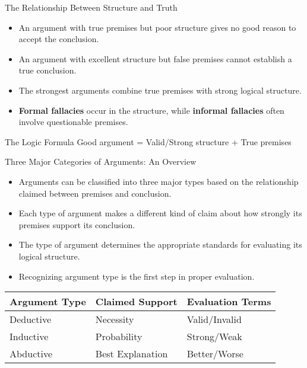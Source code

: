 \documentclass{beamer}
\begin{document}
\begin{frame}{The Relationship Between Structure and Truth}
    \begin{itemize}
        \item An argument with true premises but poor structure gives no good reason to accept the conclusion.
        \item An argument with excellent structure but false premises cannot establish a true conclusion.
        \item The strongest arguments combine true premises with strong logical structure.
        \item \textbf{Formal fallacies} occur in the structure, while \textbf{informal fallacies} often involve questionable premises.
    \end{itemize}
    
    \begin{block}{The Logic Formula}
        Good argument = Valid/Strong structure + True premises
    \end{block}
\end{frame}

\begin{frame}{Three Major Categories of Arguments: An Overview}
    \begin{itemize}
        \item Arguments can be classified into three major types based on the relationship claimed between premises and conclusion.
        \item Each type of argument makes a different kind of claim about how strongly its premises support its conclusion.
        \item The type of argument determines the appropriate standards for evaluating its logical structure.
        \item Recognizing argument type is the first step in proper evaluation.
    \end{itemize}
    
    \begin{table}
        \centering
        \begin{tabular}{|l|l|l|}
            \hline
            \textbf{Argument Type} & \textbf{Claimed Support} & \textbf{Evaluation Terms} \\
            \hline
            Deductive & Necessity & Valid/Invalid \\
            \hline
            Inductive & Probability & Strong/Weak \\
            \hline
            Abductive & Best Explanation & Better/Worse \\
            \hline
        \end{tabular}
    \end{table}
\end{frame}
\end{document}
